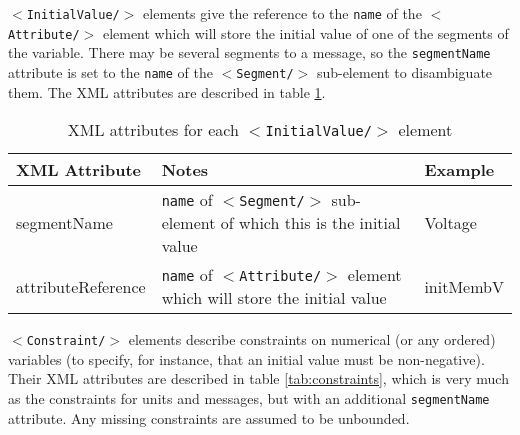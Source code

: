 \documentclass[pdftex,a4paper]{article}
\newcommand{\XML}[2][]{{\tt \small $<$#2#1/$>$}}
\newcommand{\XMLfont}[1]{{\tt \small #1}}
\begin{document}
\XML{InitialValue} elements give the reference to the \XMLfont{name}
of the \XML{Attribute} element which will store the initial value of
one of the segments of the variable. There may be several segments
to a message, so the \XMLfont{segmentName} attribute is set to the
\XMLfont{name} of the \XML{Segment} sub-element to disambiguate
them. The XML attributes are described in table \ref{tab:init}.

\begin{table}[!h]
  \begin{center}
    \caption{XML attributes for each \XML{InitialValue} element}
    \label{tab:init}
    \begin{tabular}{|l|p{6cm}|l|}
      \hline

      \textbf{XML Attribute} & \textbf{Notes} & \textbf{Example}\\

      \hline

      segmentName & \XMLfont{name} of \XML{Segment} sub-element of which
      this is the initial value & Voltage\\

      \hline

      attributeReference & \XMLfont{name} of \XML{Attribute} element
      which will store the initial value & initMembV\\

      \hline
    \end{tabular}
  \end{center}
\end{table}


\XML{Constraint} elements describe constraints on numerical (or any
ordered) variables (to specify, for instance, that an initial value must
be non-negative). Their XML attributes are described in table
\ref{tab:constraints}, which is very much as the constraints for units
and messages, but with an additional \XMLfont{segmentName}
attribute. Any missing constraints are assumed to be unbounded.
\end{document}
